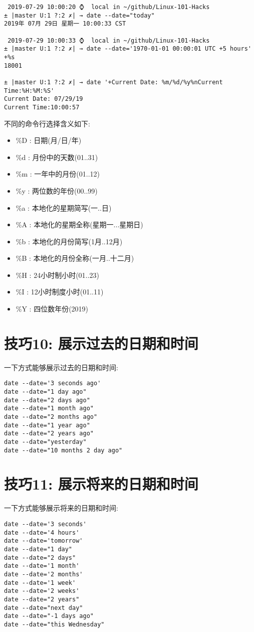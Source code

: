 \documentclass[UTF8]{ctexart}
\begin{document}
\begin{lstlisting}
 2019-07-29 10:00:20 ⌚  local in ~/github/Linux-101-Hacks                                                                                                                    
± |master U:1 ?:2 ✗| → date --date="today"
2019年 07月 29日 星期一 10:00:33 CST

 2019-07-29 10:00:33 ⌚  local in ~/github/Linux-101-Hacks
± |master U:1 ?:2 ✗| → date --date='1970-01-01 00:00:01 UTC +5 hours' +%s
18001

± |master U:1 ?:2 ✗| → date '+Current Date: %m/%d/%y%nCurrent Time:%H:%M:%S'
Current Date: 07/29/19
Current Time:10:00:57
\end{lstlisting}
不同的命令行选择含义如下:
\begin{itemize}
    \item \%D : 日期(月/日/年)
    \item \%d : 月份中的天数(01..31)
    \item \%m : 一年中的月份(01..12)
    \item \%y : 两位数的年份(00..99)
    \item \%a : 本地化的星期简写(一..日)
    \item \%A : 本地化的星期全称(星期一...星期日)
    \item \%b : 本地化的月份简写(1月..12月)
    \item \%B : 本地化的月份全称(一月..十二月)
    \item \%H : 24小时制小时(01..23)
    \item \%I : 12小时制度小时(01..11)
    \item \%Y : 四位数年份(2019)
\end{itemize}


\section*{技巧10: 展示过去的日期和时间}
一下方式能够展示过去的日期和时间:
\begin{lstlisting}
date --date='3 seconds ago'
date --date="1 day ago"
date --date="2 days ago"
date --date="1 month ago"
date --date="2 months ago"
date --date="1 year ago"
date --date="2 years ago"
date --date="yesterday"
date --date="10 months 2 day ago"
\end{lstlisting}


\section*{技巧11: 展示将来的日期和时间}
一下方式能够展示将来的日期和时间:
\begin{lstlisting}
date --date='3 seconds'
date --date='4 hours'
date --date='tomorrow'
date --date="1 day"
date --date="2 days"
date --date='1 month'
date --date='2 months'
date --date='1 week'
date --date='2 weeks'
date --date="2 years"
date --date="next day"
date --date="-1 days ago"
date --date="this Wednesday"
\end{lstlisting}
\end{document}
